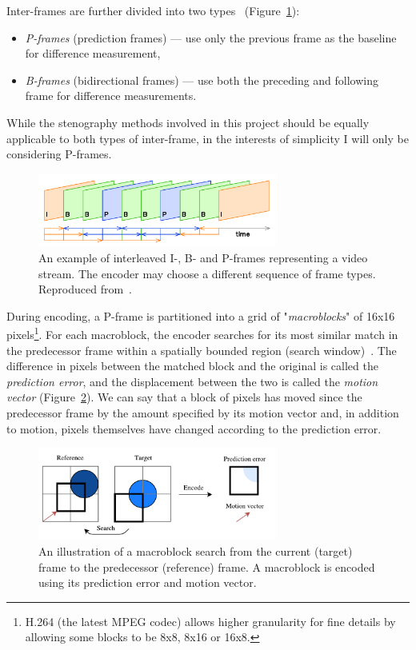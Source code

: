 \documentclass[12pt,british,twoside,notitlepage,usenames,dvipsnames,hypens,final]{report}
\numberwithin{equation}{section}
\numberwithin{figure}{section}
\begin{document}
Inter-frames are further divided into two types~\cite{crowcroft1999internetworking} (Figure~\ref{fig:ipb-seq}):
\begin{itemize}
\item \emph{P-frames} (prediction frames) --- use only the previous frame as the baseline for difference measurement,
\item \emph{B-frames} (bidirectional frames) --- use both the preceding and following frame for difference measurements. 
\end{itemize}

While the stenography methods involved in this project should be equally applicable to both types of inter-frame, in the interests of simplicity I will only be considering P-frames.

\begin{figure}[tbh]
\centerline{\includegraphics[width=0.7\textwidth, height=0.7\textheight, keepaspectratio]{img/IPB_images_sequence.png}}
\caption{An example of interleaved I-, B- and P-frames representing a video stream. The encoder may choose a different sequence of frame types. Reproduced from~\cite{interframe-wiki}.}
\label{fig:ipb-seq}
\end{figure}

During encoding, a P-frame is partitioned into a grid of "\emph{macroblocks}" of 16x16 pixels\footnote{H.264 (the latest MPEG codec) allows higher granularity for fine details by allowing some blocks to be 8x8, 8x16 or 16x8.}. For each macroblock, the encoder searches for its most similar match in the predecessor frame within a spatially bounded region (search window)~\cite[p.~256]{richardson2004h}. The difference in pixels between the matched block and the original is called the \emph{prediction error}, and the displacement between the two is called the \emph{motion vector} (Figure~\ref{fig:mb-search}). We can say that a block of pixels has moved since the predecessor frame by the amount specified by its motion vector and, in addition to motion, pixels themselves have changed according to the prediction error.

\begin{figure}[tbh]
\centerline{\includegraphics[width=0.7\textwidth,height=0.7\textheight,keepaspectratio]
{img/macroblock-diagram.pdf}}
\caption{An illustration of a macroblock search from the current (target) frame to the predecessor (reference) frame. A macroblock is encoded using its prediction error and  motion vector.}
\label{fig:mb-search}
\end{figure} 
\end{document}
